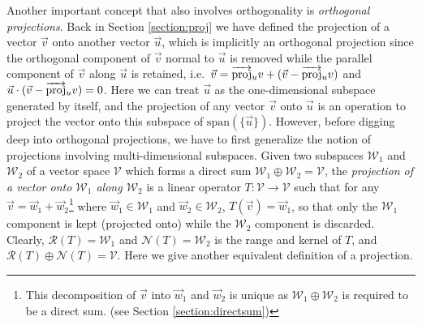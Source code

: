 Another important concept that also involves orthogonality is \textit{orthogonal projections}. Back in Section \ref{section:proj} we have defined the projection of a vector $\vec{v}$ onto another vector $\vec{u}$, which is implicitly an orthogonal projection since the orthogonal component of $\vec{v}$ normal to $\vec{u}$ is removed while the parallel component of $\vec{v}$ along $\vec{u}$ is retained, i.e.\ $\vec{v} = \smash{\overrightarrow{\text{proj}}_u} v + (\vec{v} - \smash{\overrightarrow{\text{proj}}_u} v)$ and $\vec{u} \cdot (\vec{v} - \smash{\overrightarrow{\text{proj}}_u} v) = 0$. Here we can treat $\vec{u}$ as the one-dimensional subspace generated by itself, and the projection of any vector $\vec{v}$ onto $\vec{u}$ is an operation to project the vector onto this subspace of $\text{span}(\{\vec{u}\})$. However, before digging deep into orthogonal projections, we have to first generalize the notion of projections involving multi-dimensional subspaces. Given two subspaces $\mathcal{W}_1$ and $\mathcal{W}_2$ of a vector space $\mathcal{V}$ which forms a direct sum $\mathcal{W}_1 \oplus \mathcal{W}_2 = \mathcal{V}$, the \textit{projection of a vector onto $\mathcal{W}_1$ along $\mathcal{W}_2$} is a linear operator $T: \mathcal{V} \to \mathcal{V}$ such that for any $\vec{v} = \vec{w}_1 + \vec{w}_2$\footnote{This decomposition of $\vec{v}$ into $\vec{w}_1$ and $\vec{w}_2$ is unique as $\mathcal{W}_1 \oplus \mathcal{W}_2$ is required to be a direct sum. (see Section \ref{section:directsum})} where $\vec{w}_1 \in \mathcal{W}_1$ and $\vec{w}_2 \in \mathcal{W}_2$, $T(\vec{v}) = \vec{w}_1$, so that only the $\mathcal{W}_1$ component is kept (projected onto) while the $\mathcal{W}_2$ component is discarded. Clearly, $\mathcal{R}(T) = \mathcal{W}_1$ and $\mathcal{N}(T) = \mathcal{W}_2$ is the range and kernel of $T$, and $\mathcal{R}(T) \oplus \mathcal{N}(T) = \mathcal{V}$. Here we give another equivalent definition of a projection.
